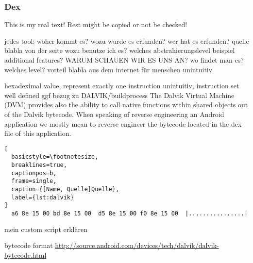 \subsubsection{Dex} \label{subsubsection:tools-dex}
This is my real text! Rest might be copied or not be checked!




jedes tool:\newline
woher kommt es?\newline
wozu wurde es erfunden?\newline
wer hat es erfunden? quelle\newline
blabla von der seite\newline
wozu benutze ich es?\newline
welches abstrahierungslevel\newline
beispiel\newline
additional features?\newline
WARUM SCHAUEN WIR ES UNS AN?\newline
wo findet man es?\newline
welches level?\newline
vorteil\newline
blabla aus dem internet\newline
für menschen unintuitiv

hexadeximal value, represent exactly one instruction\newline
unintuitiv, instruction set well defined\newline
ggf bezug zu DALVIK/buildprocess
The Dalvik Virtual Machine (DVM) provides also the ability to call native functions within shared objects out of the Dalvik bytecode. When speaking of reverse engineering an Android application we mostly mean to reverse engineer the bytecode located in the dex file of this application.\newline

\begin{lstlisting}[
  basicstyle=\footnotesize,
  breaklines=true,
  captionpos=b,
  frame=single,
  caption={[Name, Quelle]Quelle},
  label={lst:dalvik}
]
  a6 8e 15 00 bd 8e 15 00  d5 8e 15 00 f0 8e 15 00  |................|
\end{lstlisting}

mein custom script erklären\newline

bytecode format \url{http://source.android.com/devices/tech/dalvik/dalvik-bytecode.html}
